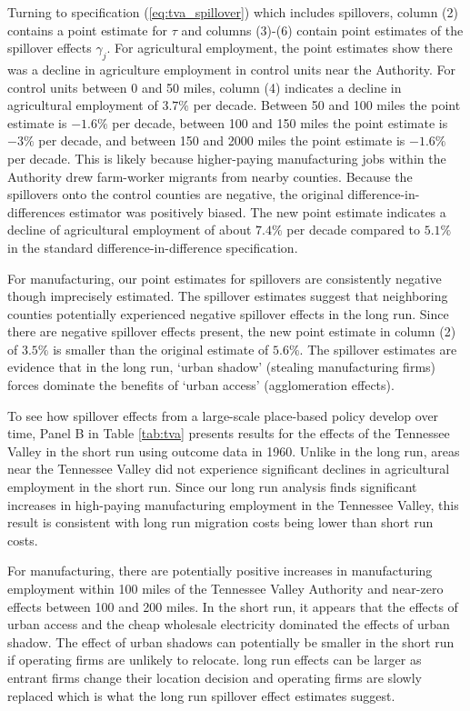 Turning to specification (\ref{eq:tva_spillover}) which includes spillovers, column (2) contains a point estimate for $\tau$ and columns (3)-(6) contain point estimates of the spillover effects $\gamma_j$. For agricultural employment, the point estimates show there was a decline in agriculture employment in control units near the Authority. For control units between 0 and 50 miles, column (4) indicates a decline in agricultural employment of $3.7\%$ per decade. Between 50 and 100 miles the point estimate is $-1.6\%$ per decade, between 100 and 150 miles the point estimate is $-3\%$ per decade, and between 150 and 2000 miles the point estimate is $-1.6\%$ per decade. This is likely because higher-paying manufacturing jobs within the Authority drew farm-worker migrants from nearby counties. Because the spillovers onto the control counties are negative, the original difference-in-differences estimator was positively biased. The new point estimate indicates a decline of agricultural employment of about $7.4\%$ per decade compared to $5.1\%$ in the standard difference-in-difference specification. 

For manufacturing, our point estimates for spillovers are consistently negative though imprecisely estimated. The spillover estimates suggest that neighboring counties potentially experienced negative spillover effects in the long run. Since there are negative spillover effects present, the new point estimate in column (2) of $3.5\%$ is smaller than the original estimate of $5.6\%$. The spillover estimates are evidence that in the long run, `urban shadow' (stealing manufacturing firms) forces dominate the benefits of `urban access' (agglomeration effects). 

To see how spillover effects from a large-scale place-based policy develop over time, Panel B in Table \ref{tab:tva} presents results for the effects of the Tennessee Valley in the short run using outcome data in 1960. Unlike in the long run, areas near the Tennessee Valley did not experience significant declines in agricultural employment in the short run. Since our long run analysis finds significant increases in high-paying manufacturing employment in the Tennessee Valley, this result is consistent with long run migration costs being lower than short run costs.

For manufacturing, there are potentially positive increases in manufacturing employment within 100 miles of the Tennessee Valley Authority and near-zero effects between 100 and 200 miles. In the short run, it appears that the effects of urban access and the cheap wholesale electricity dominated the effects of urban shadow. The effect of urban shadows can potentially be smaller in the short run if operating firms are unlikely to relocate. long run effects can be larger as entrant firms change their location decision and operating firms are slowly replaced which is what the long run spillover effect estimates suggest.

